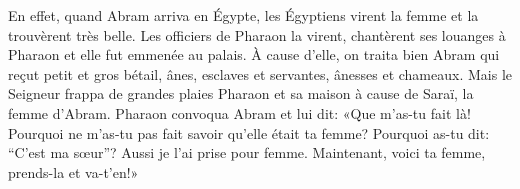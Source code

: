 En effet, quand Abram arriva en Égypte,
	les Égyptiens virent la femme et la trouvèrent très belle.
Les officiers de Pharaon la virent,
	chantèrent ses louanges à Pharaon
	et elle fut emmenée au palais.
À cause d’elle, on traita bien Abram
	qui reçut petit et gros bétail, ânes, esclaves et servantes,
		ânesses et chameaux.
Mais le Seigneur frappa de grandes plaies Pharaon et sa maison
	à cause de Saraï, la femme d’Abram.
Pharaon convoqua Abram et lui dit:
	«Que m’as-tu fait là!
	Pourquoi ne m’as-tu pas fait savoir qu’elle était ta femme?
	Pourquoi as-tu dit: “C’est ma sœur”?
	Aussi je l’ai prise pour femme.
Maintenant, voici ta femme, prends-la et va-t’en!»
